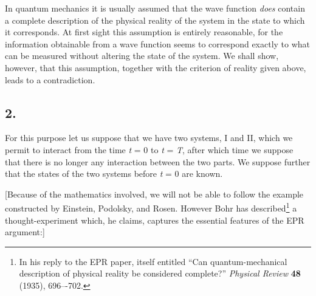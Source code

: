 In quantum mechanics it is usually assumed that the wave function
\emph{does} contain a complete description of the physical reality of
the system in the state to which it corresponds. At first sight this
assumption is entirely reasonable, for the information obtainable from a
wave function seems to correspond exactly to what can be measured
without altering the state of the system. We shall show, however, that
this assumption, together with the criterion of reality given above,
leads to a contradiction.

\subsection*{2.}

For this purpose let us suppose that we have two systems, I and II,
which we permit to interact from the time \emph{t} = 0 to \emph{t} =
\emph{T}, after which time we suppose that there is no longer any
interaction between the two parts. We suppose further that the states of
the two systems before \emph{t} = 0 are known.

[Because of the mathematics involved, we will not be able to follow the
example constructed by Einstein, Podolsky, and Rosen. However Bohr has
described\footnote{In his reply to the EPR paper, itself entitled ``Can quantum-mechanical 
description of physical reality be considered complete?'' \emph{Physical Review} 
\textbf{48} (1935), 696–-702.} a thought-experiment which, he claims,
captures the essential features of the EPR argument:]

